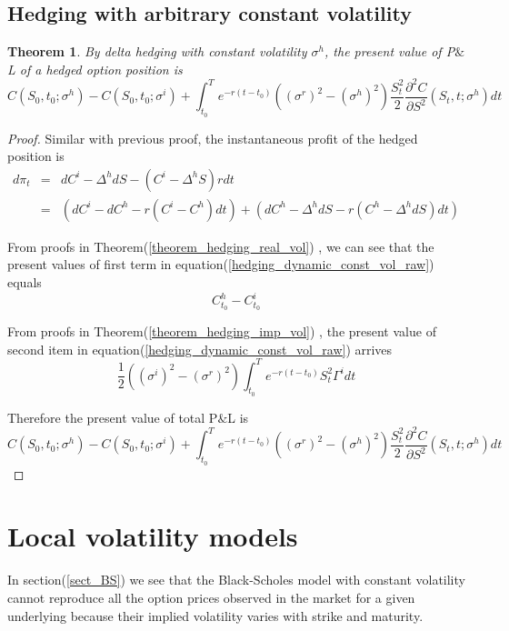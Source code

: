 \documentclass[10pt]{article}
\theoremstyle{plain}
\newtheorem{theorem}{Theorem}[section]
\numberwithin{equation}{section}
\numberwithin{table}{section}
\newcommand{\s}{\sigma}
\newcommand{\prt}[1]{\left( #1 \right)}  %
\newcommand{\pa}{\partial}
\begin{document}
\subsection{Hedging with arbitrary constant volatility}

\begin{theorem}
    By delta hedging with constant volatility $\s^h$, the present value of P$\&$L of a hedged option position is 
    \[
        C(S_0,t_0;\s^h)-C(S_0,t_0;\s^i) + \int_{t_0}^T e^{-r(t-t_0)}((\s^r)^2-(\s^h)^2)\frac{S_t^2}{2}\frac{\pa^2 C}{\pa S^2}(S_t,t;\s^h) dt    
    \]
\end{theorem}

\begin{proof}
    Similar with previous proof, the instantaneous profit of the hedged position is
    \begin{eqnarray}
        d\pi_t &=& dC^i - \Delta^h dS - (C^i -\Delta^h S)rdt  \nonumber \\
        &=& \prt{dC^i - dC^h - r(C^i - C^h)dt} + \prt{dC^h - \Delta^h dS  - r(C^h-\Delta^h dS)dt}  
        \label{hedging_dynamic_const_vol_raw}
    \end{eqnarray}

    From proofs in Theorem(\ref{theorem_hedging_real_vol}) , we can see that the present values of first term in equation(\ref{hedging_dynamic_const_vol_raw}) equals
    \[
        C^h_{t_0} - C^i_{t_0}    
    \]

    From proofs in Theorem(\ref{theorem_hedging_imp_vol}) , the present value of second item in equation(\ref{hedging_dynamic_const_vol_raw}) arrives
    \[
        \frac{1}{2}\prt{(\s^i)^2 - (\s^r)^2 }  \int_{t_0}^T e^{-r(t-t_0)}  S^2_t \Gamma^i dt  
    \]
    
    Therefore the present value of total P$\&$L is 
    \[
        C(S_0,t_0;\s^h)-C(S_0,t_0;\s^i) + \int_{t_0}^T e^{-r(t-t_0)}((\s^r)^2-(\s^h)^2)\frac{S_t^2}{2}\frac{\pa^2 C}{\pa S^2}(S_t,t;\s^h) dt   
    \]

\end{proof}


\section{Local volatility models}

In section(\ref{sect_BS}) we see that the Black-Scholes model with constant volatility
cannot reproduce all the option prices observed in the market for a given underlying
because their implied volatility varies with strike and maturity.
\end{document}
